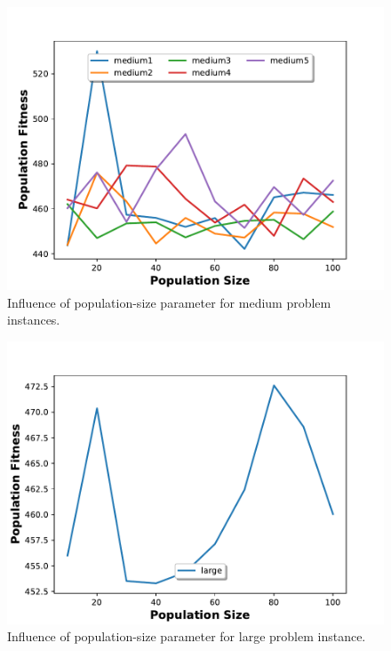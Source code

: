 \begin{figure}[h]
\centering
\includegraphics[height=0.30\textheight]{figures/medium_population.pdf}
\caption{Influence of population-size parameter for medium problem instances.}%
\label{fig:mediump}%
\end{figure}

\begin{figure}[h]
\centering
\includegraphics[height=0.30\textheight]{figures/large_population.pdf}
\caption{Influence of population-size parameter for large problem instance.}%
\label{fig:largep}%
\end{figure}

